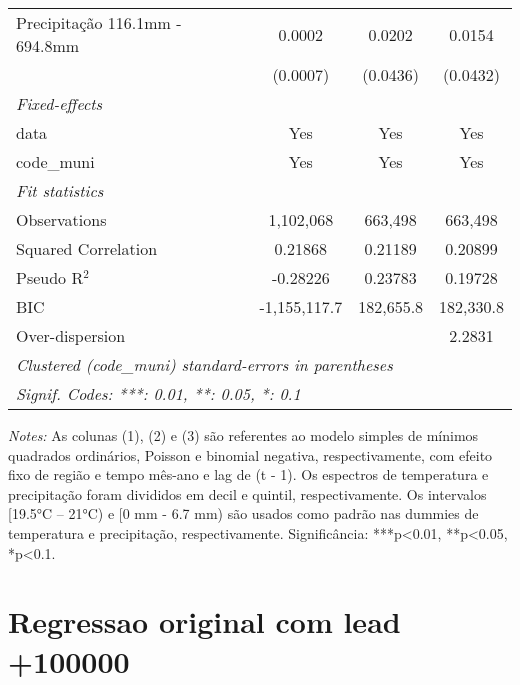 \documentclass[
]{article}
\begin{document}
\begin{table}[htbp]
\begin{tabular}{lccc}
Precipitação 116.1mm - 694.8mm & 0.0002 & 0.0202 & 0.0154\\
  &(0.0007) & (0.0436) & (0.0432)\\
\midrule \emph{Fixed-effects}&   &   &  \\
data & Yes & Yes & Yes\\
code\_muni & Yes & Yes & Yes\\
\midrule \emph{Fit statistics}&  & & \\
Observations & 1,102,068&663,498&663,498\\
Squared Correlation & 0.21868&0.21189&0.20899\\
Pseudo R$^2$ & -0.28226&0.23783&0.19728\\
BIC & -1,155,117.7&182,655.8&182,330.8\\
Over-dispersion & &&2.2831\\
\midrule\midrule\multicolumn{4}{l}{\emph{Clustered (code\_muni) standard-errors in parentheses}}\\
\multicolumn{4}{l}{\emph{Signif. Codes: ***: 0.01, **: 0.05, *: 0.1}}\\
\end{tabular}

\medskip \emph{Notes:} As colunas (1), (2) e (3) são referentes ao modelo simples de mínimos quadrados ordinários, Poisson e binomial negativa, respectivamente, com efeito fixo de região e tempo mês-ano e lag de (t - 1). Os espectros de temperatura e precipitação foram divididos em decil e quintil, respectivamente. Os intervalos [19.5°C – 21°C) e [0 mm - 6.7 mm) são usados como padrão nas dummies de temperatura e precipitação, respectivamente. Significância: ***p<0.01, **p<0.05, *p<0.1.
\end{table}

\hypertarget{regressao-original-com-lead-100000}{%
\section{Regressao original com lead
+100000}\label{regressao-original-com-lead-100000}}
\end{document}
